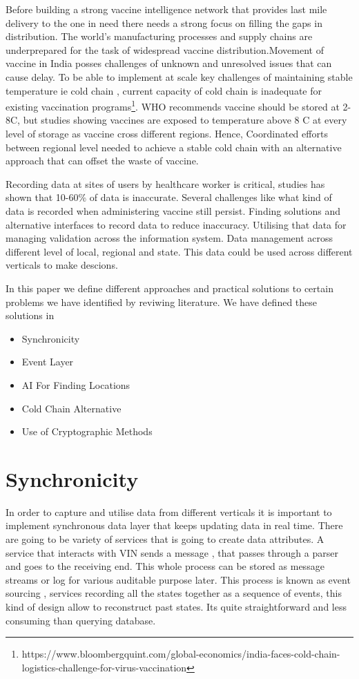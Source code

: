 \documentclass{article}
\begin{document}
Before building a strong vaccine intelligence network that provides last mile delivery to the one in need there needs a strong focus on filling the gaps in distribution. The world’s manufacturing processes and supply chains are underprepared for the task of widespread vaccine distribution\cite{bae2020challenges}.Movement of vaccine in India posses challenges of unknown and unresolved issues that can cause delay. To be able to implement at scale key challenges of maintaining stable temperature ie cold chain , current capacity of cold chain is inadequate for existing vaccination programs\footnote{https://www.bloombergquint.com/global-economics/india-faces-cold-chain-logistics-challenge-for-virus-vaccination}. WHO recommends vaccine should be stored at 2-8\degree C, but studies showing vaccines are exposed to temperature above 8 \degree C\cite{dhere2011pandemic} at every level of storage as vaccine cross different regions. Hence, Coordinated efforts between regional level needed to achieve a stable cold chain with an alternative approach that can offset the waste of vaccine.

Recording data at sites of users by healthcare worker is critical, studies has shown that 10-60\% of data is inaccurate\cite{atkinson2020digital}. Several challenges like what kind of data is recorded when administering vaccine still persist. Finding solutions and alternative interfaces to record data to reduce inaccuracy. Utilising that data for managing validation across the information system. Data management across different level of local, regional and state. This data could be used across different verticals to make descions.

In this paper we define different approaches and practical solutions to certain problems we have identified by reviwing literature. We have defined these solutions in 

\begin{itemize}
	\item Synchronicity
	\item Event Layer
	\item AI For Finding Locations
	\item Cold Chain Alternative
	\item Use of Cryptographic Methods
\end{itemize}




\section{Synchronicity}
In order to capture and utilise data from different verticals it is important to implement synchronous data layer that keeps updating data in real time. There are going to be variety of services that is going to create data attributes. A service that interacts with VIN sends a message , that passes through a parser and goes to the receiving end. This whole process can be stored as message streams or log for various auditable purpose later. This process is known as event sourcing , services recording all the states together as a sequence of events, this kind of design allow to reconstruct past states. Its quite straightforward and less consuming than querying database.
\end{document}
